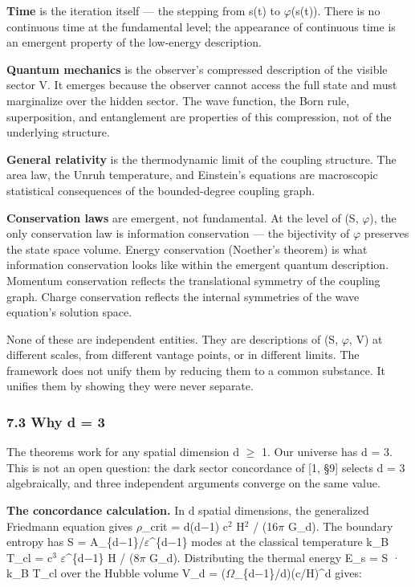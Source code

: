 \documentclass[
  11pt,
]{article}
\begin{document}
\textbf{Time} is the iteration itself --- the stepping from s(t) to
\ensuremath{\varphi}(s(t)). There is no continuous time at the fundamental level; the
appearance of continuous time is an emergent property of the low-energy
description.

\textbf{Quantum mechanics} is the observer's compressed description of
the visible sector V. It emerges because the observer cannot access the
full state and must marginalize over the hidden sector. The wave
function, the Born rule, superposition, and entanglement are properties
of this compression, not of the underlying structure.

\textbf{General relativity} is the thermodynamic limit of the coupling
structure. The area law, the Unruh temperature, and Einstein's equations
are macroscopic statistical consequences of the bounded-degree coupling
graph.

\textbf{Conservation laws} are emergent, not fundamental. At the level
of (S, \ensuremath{\varphi}), the only conservation law is information conservation --- the
bijectivity of \ensuremath{\varphi} preserves the state space volume. Energy conservation
(Noether's theorem) is what information conservation looks like within
the emergent quantum description. Momentum conservation reflects the
translational symmetry of the coupling graph. Charge conservation
reflects the internal symmetries of the wave equation's solution space.

None of these are independent entities. They are descriptions of (S, \ensuremath{\varphi},
V) at different scales, from different vantage points, or in different
limits. The framework does not unify them by reducing them to a common
substance. It unifies them by showing they were never separate.

\hypertarget{why-d-3}{%
\subsubsection{7.3 Why d = 3}\label{why-d-3}}

The theorems work for any spatial dimension d \ensuremath{\geq} 1. Our universe has d =
3. This is not an open question: the dark sector concordance of {[}1,
§9{]} selects d = 3 algebraically, and three independent arguments
converge on the same value.

\textbf{The concordance calculation.} In d spatial dimensions, the
generalized Friedmann equation gives \ensuremath{\rho}\_crit = d(d\ensuremath{-}1) c\ensuremath{^2} H\ensuremath{^2} / (16\ensuremath{\pi}
G\_d). The boundary entropy has S = A\_\{d\ensuremath{-}1\}/\ensuremath{\varepsilon}\^{}\{d\ensuremath{-}1\} modes at the
classical temperature k\_B T\_cl = c\ensuremath{^3} \ensuremath{\varepsilon}\^{}\{d\ensuremath{-}1\} H / (8\ensuremath{\pi} G\_d).
Distributing the thermal energy E\_s = S · k\_B T\_cl over the Hubble
volume V\_d = (\ensuremath{\Omega}\_\{d\ensuremath{-}1\}/d)(c/H)\^{}d gives:
\end{document}
